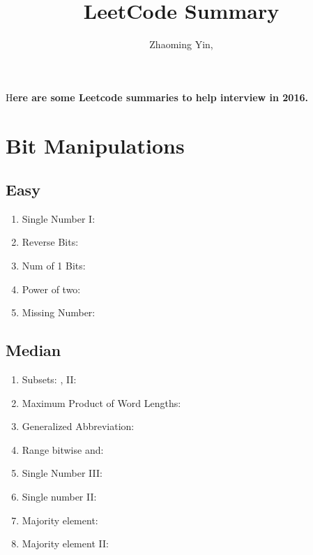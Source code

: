 \documentclass[DIV=calc, paper=a4, fontsize=11pt, twocolumn]{scrartcl}	 %
\title{LeetCode Summary} %
\author{Zhaoming Yin, } %
\date{} %
\newcommand{\initial}[1]{ %
\lettrine[lines=3,lhang=0.3,nindent=0em]{
\color{DarkGoldenrod}
{\textsf{#1}}}{}}
\begin{document}
\maketitle %

\thispagestyle{fancy} %


\initial{H}\textbf{ere are some Leetcode summaries to help interview in 2016. }


\section*{Bit Manipulations}

\subsection*{Easy}

\begin{enumerate}
\item Single Number I: \cite{136} 
\item Reverse Bits:    \cite{190}
\item Num of 1 Bits:   \cite{191} 
\item Power of two:    \cite{231} 
\item Missing Number:  \cite{268}  
\end{enumerate}

\subsection*{Median}

\begin{enumerate}
\item Subsets: \cite{078}, II: \cite{090}
\item Maximum Product of Word Lengths: \cite{318} 
\item Generalized Abbreviation: \cite{320}
\item Range bitwise and: \cite{201} 

\item Single Number III: \cite{260} 
\item Single number II: \cite{137}
\item Majority element: \cite{169}
\item Majority element II: \cite{229}
\end{enumerate}
\end{document}
